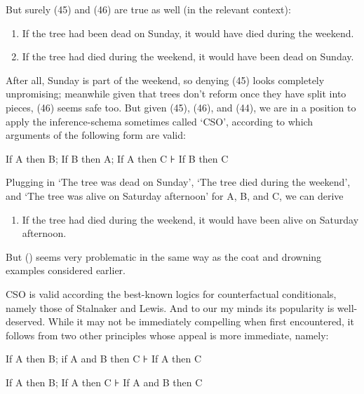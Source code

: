 But surely (45) and (46) are true as well (in the relevant context):

\begin{enumerate}
\def\labelenumi{(\arabic{enumi})}
\setcounter{enumi}{44}
\item
  If the tree had been dead on Sunday, it would have died during the
  weekend.
\item
  If the tree had died during the weekend, it would have been dead on
  Sunday.
\end{enumerate}

After all, Sunday is part of the weekend, so denying (45) looks
completely unpromising; meanwhile given that trees don't reform once
they have split into pieces, (46) seems safe too. But given (45), (46),
and (44), we are in a position to apply the inference-schema sometimes
called `CSO', according to which arguments of the following form are
valid:

\begin{description}
\itemsep1pt\parskip0pt
\item[CSO]
If A then B; If B then A; If A then C ⊦ If B then C
\end{description}

Plugging in `The tree was dead on Sunday', `The tree died during the
weekend', and `The tree was alive on Saturday afternoon' for A, B, and
C, we can derive

\begin{enumerate}
\def\labelenumi{(\arabic{enumi})}
\setcounter{enumi}{46}
\itemsep1pt\parskip0pt
\item
  If the tree had died during the weekend, it would have been alive on
  Saturday afternoon.
\end{enumerate}

But () seems very problematic in the same way as the coat and drowning
examples considered earlier.

CSO is valid according the best-known logics for counterfactual
conditionals, namely those of Stalnaker and Lewis. And to our my minds
its popularity is well-deserved. While it may not be immediately
compelling when first encountered, it follows from two other principles
whose appeal is more immediate, namely:

\begin{description}
\itemsep1pt\parskip0pt
\item[Cumulative Transitivity (CT)]
If A then B; if A and B then C ⊦ If A then C
\item[Very Limited Antecedent Strengthening (VLAS)]
If A then B; If A then C ⊦ If A and B then C
\end{description}

